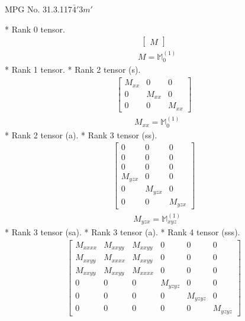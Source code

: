 \documentclass[fleqn,8pt,landscape]{jsarticle}
\begin{document}
\setcounter{MaxMatrixCols}{32}

\renewcommand{\tablename}{Table~}
\renewcommand{\figurename}{Figure~}
\begin{center}
\LARGE
MPG No. 31.3.117\quad$\bar{4}'3m'$
\end{center}
* Rank 0 tensor.
\begin{align*}
\begin{bmatrix} M \end{bmatrix}
\end{align*}
\begin{align*}
& M = \mathbb{M}_{0}^{(1)}
\end{align*}
* Rank 1 tensor.
* Rank 2 tensor (s).
\begin{align*}
\begin{bmatrix} M_{xx} & 0 & 0 \\ 0 & M_{xx} & 0 \\ 0 & 0 & M_{xx} \end{bmatrix}
\end{align*}
\begin{align*}
& M_{xx} = \mathbb{M}_{0}^{(1)}
\end{align*}
* Rank 2 tensor (a).
* Rank 3 tensor (ss).
\begin{align*}
\begin{bmatrix} 0 & 0 & 0 \\ 0 & 0 & 0 \\ 0 & 0 & 0 \\ M_{yzx} & 0 & 0 \\ 0 & M_{yzx} & 0 \\ 0 & 0 & M_{yzx} \end{bmatrix}
\end{align*}
\begin{align*}
& M_{yzx} = \mathbb{M}_{xyz}^{(1)}
\end{align*}
* Rank 3 tensor (sa).
* Rank 3 tensor (a).
* Rank 4 tensor (sss).
\begin{align*}
\begin{bmatrix} M_{xxxx} & M_{xxyy} & M_{xxyy} & 0 & 0 & 0 \\ M_{xxyy} & M_{xxxx} & M_{xxyy} & 0 & 0 & 0 \\ M_{xxyy} & M_{xxyy} & M_{xxxx} & 0 & 0 & 0 \\ 0 & 0 & 0 & M_{yzyz} & 0 & 0 \\ 0 & 0 & 0 & 0 & M_{yzyz} & 0 \\ 0 & 0 & 0 & 0 & 0 & M_{yzyz} \end{bmatrix}
\end{align*}
\end{document}
